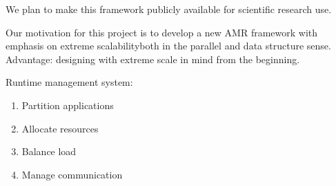 \documentclass[14pt,letter]{article}
\begin{document}
We plan to make this framework publicly available for scientific research use.

Our motivation for this project is to develop a new AMR framework with emphasis on extreme scalabilityboth in the parallel and data structure sense.
Advantage: designing with extreme scale in mind from the beginning.



Runtime management system:
\begin{enumerate}
\item Partition applications
\item Allocate resources
\item Balance load
\item Manage communication
\end{enumerate}
\end{document}
